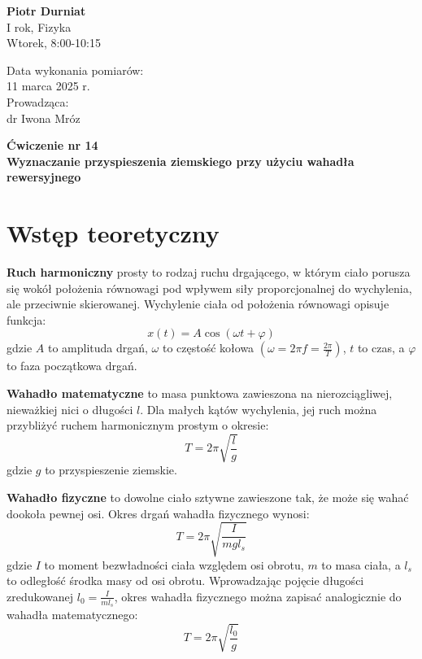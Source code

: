 \documentclass[a4paper,12pt]{article}
\begin{document}
\noindent
\begin{minipage}{0.5\textwidth}
    \raggedright
    \textbf{Piotr Durniat} \\
    I rok, Fizyka \\
    Wtorek, 8:00-10:15 \\
    \vspace{0.5cm}
    \vspace{0.5cm}
\end{minipage}%
\begin{minipage}{0.5\textwidth}
    \raggedleft
    Data wykonania pomiarów: \\
    11 marca 2025 r. \\
    \vspace{0.5cm} %
    Prowadząca: \\
    dr Iwona Mróz 
\end{minipage}

\vspace{2cm} %
\begin{center}
    \LARGE \textbf{Ćwiczenie nr 14} \\[0.5cm]
    \Large \textbf{Wyznaczanie przyspieszenia ziemskiego przy użyciu wahadła rewersyjnego}
\end{center}

\vspace{1cm} %
\noindent

\section{Wstęp teoretyczny}
\textbf{Ruch harmoniczny} prosty to rodzaj ruchu drgającego, w którym ciało porusza się wokół położenia równowagi pod wpływem siły proporcjonalnej do wychylenia, ale przeciwnie skierowanej. Wychylenie ciała od położenia równowagi opisuje funkcja:
\[
x(t) = A \cos(\omega t + \varphi)
\]
gdzie \( A \) to amplituda drgań, \( \omega \) to częstość kołowa \( \left(\omega = 2\pi f = \frac{2\pi}{T} \right) \), \( t \) to czas, a \( \varphi \) to faza początkowa drgań.

\textbf{Wahadło matematyczne} to masa punktowa zawieszona na nierozciągliwej, nieważkiej nici o długości $l$. Dla małych kątów wychylenia, jej ruch można przybliżyć ruchem harmonicznym prostym o okresie:
\[
T = 2\pi\sqrt{\frac{l}{g}}
\]
gdzie $g$ to przyspieszenie ziemskie.

\textbf{Wahadło fizyczne} to dowolne ciało sztywne zawieszone tak, że może się wahać dookoła pewnej osi. Okres drgań wahadła fizycznego wynosi:
\[
T = 2\pi\sqrt{\frac{I}{mgl_s}}
\]
gdzie $I$ to moment bezwładności ciała względem osi obrotu, $m$ to masa ciała, a $l_s$ to odległość środka masy od osi obrotu. Wprowadzając pojęcie długości zredukowanej $l_0 = \frac{I}{ml_s}$, okres wahadła fizycznego można zapisać analogicznie do wahadła matematycznego:
\begin{equation}
    T=2\pi\sqrt{\frac{l_0}{g}}
\end{equation}
\end{document}
